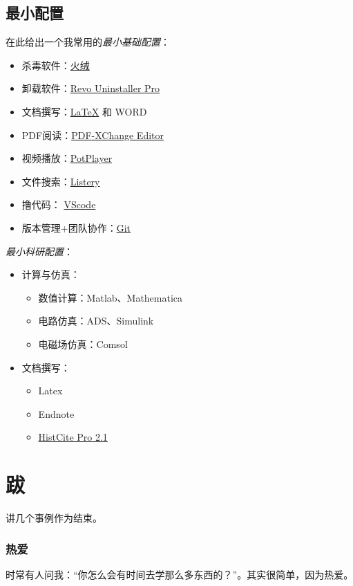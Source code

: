 \documentclass[UTF8]{ctexbook}
\begin{document}
\section{最小配置}
在此给出一个我常用的\emph{最小基础配置}：
\begin{itemize}
	\item 杀毒软件：\href{https://www.huorong.cn}{火绒}
	\item 卸载软件：\href{http://www.xue51.com/soft/11977.html}{Revo Uninstaller Pro}
	\item 文档撰写：\href{https://mirrors.tuna.tsinghua.edu.cn/CTAN/systems/texlive/Images/}{\LaTeX} 和 WORD
	\item PDF阅读：\href{https://www.tracker-software.com/product/pdf-xchange-editor}{PDF-XChange Editor}
	\item 视频播放：\href{http://potplayer.daum.net/?lang=zh_CN}{PotPlayer}
	\item 文件搜索：\href{https://www.listary.com}{Listery}
	\item 撸代码： \href{https://code.visualstudio.com}{VScode}
	\item 版本管理+团队协作：\href{https://git-scm.com}{Git}
\end{itemize}

\emph{最小科研配置}：
\begin{itemize}
	\item 计算与仿真：
	      \begin{itemize}
		      \item 数值计算：Matlab、Mathematica
		      \item 电路仿真：ADS、Simulink
		      \item 电磁场仿真：Comsol
	      \end{itemize}
	\item 文档撰写：
	      \begin{itemize}
		      \item Latex
		      \item Endnote
		      \item \href{https://zhuanlan.zhihu.com/p/20902898}{HistCite Pro 2.1}
	      \end{itemize}
\end{itemize}



\backmatter
\chapter{跋}
讲几个事例作为结束。

\subsection*{热爱}
时常有人问我：“你怎么会有时间去学那么多东西的？”。其实很简单，因为热爱。
\end{document}
